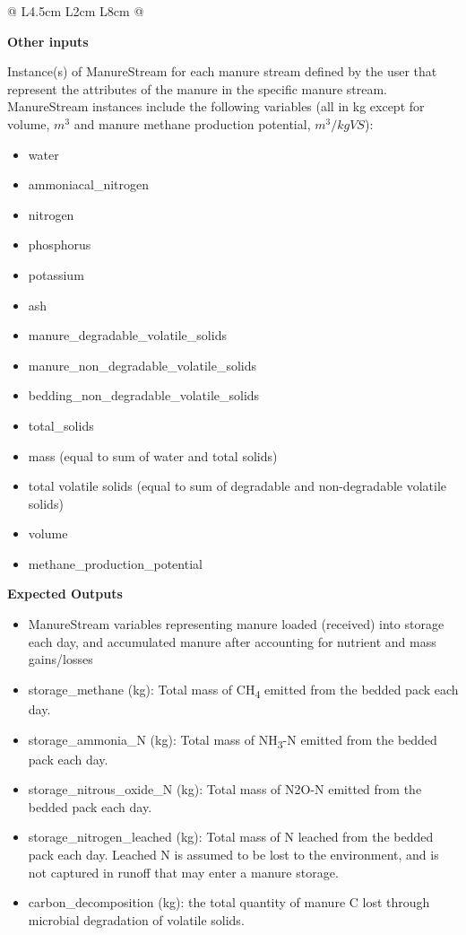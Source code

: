 \begin{refsection}
\begin{table}[h!]
\begin{tabular}{@{} L{4.5cm} L{2cm} L{8cm} @{}}
    \bottomrule
    \end{tabular}
    \end{table}  
    \vspace{0.5cm}
    
\textbf{Other inputs}
\vspace{ 0.25cm}

Instance(s) of ManureStream for each manure stream defined by the user that represent the attributes of the manure in the specific manure stream. ManureStream instances include the following variables (all in kg except for volume, \(m^3\) and manure methane production potential, \(m^3 / kgVS\)):
    \begin{itemize}
        \item water 
        \item ammoniacal\_nitrogen
        \item nitrogen 
        \item phosphorus
        \item potassium
        \item ash
        \item manure\_degradable\_volatile\_solids
        \item manure\_non\_degradable\_volatile\_solids
        \item bedding\_non\_degradable\_volatile\_solids
        \item total\_solids
        \item mass (equal to sum of water and total solids)
        \item total volatile solids (equal to sum of degradable and non-degradable volatile solids)
        \item volume
        \item methane\_production\_potential
\end{itemize}
\vspace{0.5cm}


\textbf{Expected Outputs}
\vspace{ 0.25cm}

\begin{itemize}
    \item ManureStream variables representing manure loaded (received) into storage each day, and accumulated manure after accounting for nutrient and mass gains/losses
    \item storage\_methane (kg): Total mass of CH\textsubscript{4} emitted from the bedded pack each day.
    \item storage\_ammonia\_N (kg): Total mass of NH\textsubscript{3}-N emitted from the bedded pack each day.
    \item storage\_nitrous\_oxide\_N (kg): Total mass of N2O-N emitted from the bedded pack each day.
    \item storage\_nitrogen\_leached (kg): Total mass of N leached from the bedded pack each day. Leached N is assumed to be lost to the environment, and is not captured in runoff that may enter a manure storage.
    \item carbon\_decomposition (kg): the total quantity of manure C lost through microbial degradation of volatile solids. 



\end{itemize}
\end{refsection}

